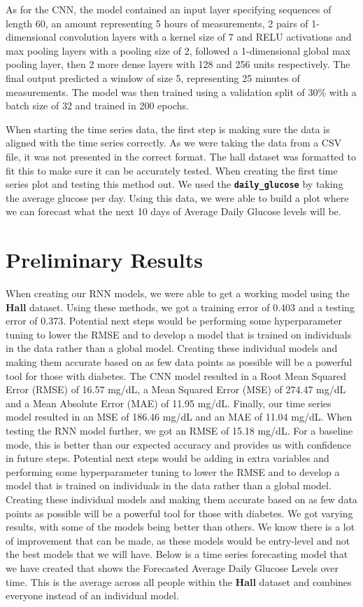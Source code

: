 \documentclass{article}
\begin{document}
As for the CNN, the model contained an input layer specifying sequences of length 60, an amount representing 5 hours of measurements, 2 pairs of 1-dimensional convolution layers with a kernel size of 7 and RELU activations and max pooling layers with a pooling size of 2, followed a 1-dimensional global max pooling layer, then 2 more dense layers with 128 and 256 units respectively. The final output predicted a window of size 5, representing 25 minutes of measurements. The model was then trained using a validation split of 30\% with a batch size of 32 and trained in 200 epochs. 

When starting the time series data, the first step is making sure the data is aligned with the time series correctly. As we were taking the data from a CSV file, it was not presented in the correct format. The hall dataset was formatted to fit this to make sure it can be accurately tested. When creating the first time series plot and testing this method out. We used the \texttt{\textbf{daily\_glucose}} by taking the average glucose per day. Using this data, we were able to build a plot where we can forecast what the next 10 days of Average Daily Glucose levels will be. 

\section*{Preliminary Results}

When creating our RNN models, we were able to get a working model using the \textbf{Hall} dataset. \cite{Blood_Glucose_RNN} Using these methods, we got a training error of 0.403 and a testing error of 0.373. Potential next steps would be performing some hyperparameter tuning to lower the RMSE and to develop a model that is trained on individuals in the data rather than a global model. Creating these individual models and making them accurate based on as few data points as possible will be a powerful tool for those with diabetes. The CNN model resulted in a Root Mean Squared Error (RMSE) of 16.57 mg/dL, a Mean Squared Error (MSE) of 274.47 mg/dL and a Mean Absolute Error (MAE) of 11.95 mg/dL. Finally, our time series model resulted in an MSE of 186.46 mg/dL and an MAE of 11.04 mg/dL.
When testing the RNN model further, we got an RMSE of 15.18 mg/dL. For a baseline mode, this is better than our expected accuracy and provides us with confidence in future steps. Potential next steps would be adding in extra variables and performing some hyperparameter tuning to lower the RMSE and to develop a model that is trained on individuals in the data rather than a global model. Creating these individual models and making them accurate based on as few data points as possible will be a powerful tool for those with diabetes.
We got varying results, with some of the models being better than others. We know there is a lot of improvement that can be made, as these models would be entry-level and not the best models that we will have. Below is a time series forecasting model that we have created that shows the Forecasted Average Daily Glucose Levels over time. This is the average across all people within the \textbf{Hall} dataset \cite{Blood_Glucose_RNN} and combines everyone instead of an individual model. 
\end{document}
